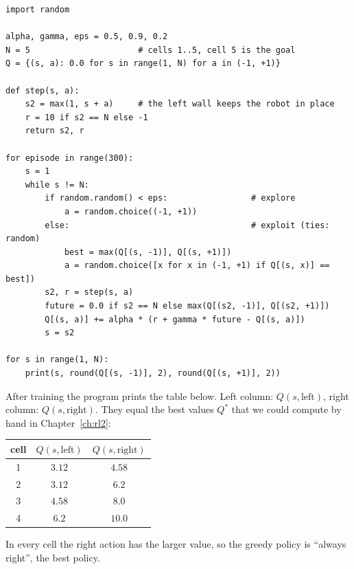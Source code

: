 \begin{verbatim}
import random

alpha, gamma, eps = 0.5, 0.9, 0.2
N = 5                      # cells 1..5, cell 5 is the goal
Q = {(s, a): 0.0 for s in range(1, N) for a in (-1, +1)}

def step(s, a):
    s2 = max(1, s + a)     # the left wall keeps the robot in place
    r = 10 if s2 == N else -1
    return s2, r

for episode in range(300):
    s = 1
    while s != N:
        if random.random() < eps:                 # explore
            a = random.choice((-1, +1))
        else:                                     # exploit (ties: random)
            best = max(Q[(s, -1)], Q[(s, +1)])
            a = random.choice([x for x in (-1, +1) if Q[(s, x)] == best])
        s2, r = step(s, a)
        future = 0.0 if s2 == N else max(Q[(s2, -1)], Q[(s2, +1)])
        Q[(s, a)] += alpha * (r + gamma * future - Q[(s, a)])
        s = s2

for s in range(1, N):
    print(s, round(Q[(s, -1)], 2), round(Q[(s, +1)], 2))
\end{verbatim}

After training the program prints the table below. Left column: $Q(s,\text{left})$, right column: $Q(s,\text{right})$. They equal the best values $Q^*$ that we could compute by hand in Chapter~\ref{ch:rl2}:
\begin{center}
\renewcommand{\arraystretch}{1.2}
\begin{tabular}{c|cc}
cell & $Q(s,\text{left})$ & $Q(s,\text{right})$\\ \hline
1 & $3.12$ & $\mathbf{4.58}$\\
2 & $3.12$ & $\mathbf{6.2}$\\
3 & $4.58$ & $\mathbf{8.0}$\\
4 & $6.2$ & $\mathbf{10.0}$
\end{tabular}
\end{center}
In every cell the right action has the larger value, so the greedy policy is ``always right'', the best policy.

